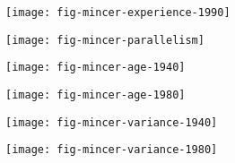 \begin{frame}[plain]
\begin{center}
\texttt{[image: fig-mincer-experience-1990]}
\end{center}
\end{frame}
\begin{frame}[plain]
\begin{center}
\texttt{[image: fig-mincer-parallelism]}
\end{center}
\end{frame}
\begin{frame}[plain]
\begin{center}
\texttt{[image: fig-mincer-age-1940]}
\end{center}
\end{frame}
\begin{frame}[plain]
\begin{center}
\texttt{[image: fig-mincer-age-1980]}
\end{center}
\end{frame}
\begin{frame}[plain]
\begin{center}
\texttt{[image: fig-mincer-variance-1940]}
\end{center}
\end{frame}
\begin{frame}[plain]
\begin{center}
\texttt{[image: fig-mincer-variance-1980]}
\end{center}
\end{frame}
